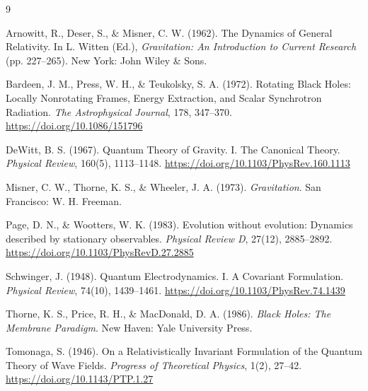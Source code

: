 \documentclass[11pt,a4paper]{article}
\begin{document}
\begin{thebibliography}{9}

Arnowitt, R., Deser, S., \& Misner, C. W. (1962). The Dynamics of General Relativity. In L. Witten (Ed.), \textit{Gravitation: An Introduction to Current Research} (pp. 227--265). New York: John Wiley \& Sons.

Bardeen, J. M., Press, W. H., \& Teukolsky, S. A. (1972). Rotating Black Holes: Locally Nonrotating Frames, Energy Extraction, and Scalar Synchrotron Radiation. \textit{The Astrophysical Journal}, 178, 347--370. \url{https://doi.org/10.1086/151796}

DeWitt, B. S. (1967). Quantum Theory of Gravity. I. The Canonical Theory. \textit{Physical Review}, 160(5), 1113--1148. \url{https://doi.org/10.1103/PhysRev.160.1113}

Misner, C. W., Thorne, K. S., \& Wheeler, J. A. (1973). \textit{Gravitation}. San Francisco: W. H. Freeman.

Page, D. N., \& Wootters, W. K. (1983). Evolution without evolution: Dynamics described by stationary observables. \textit{Physical Review D}, 27(12), 2885--2892. \url{https://doi.org/10.1103/PhysRevD.27.2885}

Schwinger, J. (1948). Quantum Electrodynamics. I. A Covariant Formulation. \textit{Physical Review}, 74(10), 1439--1461. \url{https://doi.org/10.1103/PhysRev.74.1439}

Thorne, K. S., Price, R. H., \& MacDonald, D. A. (1986). \textit{Black Holes: The Membrane Paradigm}. New Haven: Yale University Press.

Tomonaga, S. (1946). On a Relativistically Invariant Formulation of the Quantum Theory of Wave Fields. \textit{Progress of Theoretical Physics}, 1(2), 27--42. \url{https://doi.org/10.1143/PTP.1.27}

\end{thebibliography}
\end{document}
